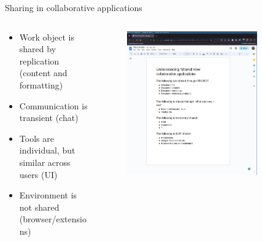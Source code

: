 \documentclass[aspectratio=169]{beamer}
\begin{document}
\begin{frame}{Sharing in collaborative applications}
    \begin{columns}
        \begin{column}{0.6\textwidth}
            \begin{itemize}
                \small
                \item Work object is shared by replication (content and formatting)
                \item Communication is transient (chat)
                \item Tools are individual, but similar across users (UI)
                \item Environment is not shared (browser/extensions)
            \end{itemize}
        \end{column}
        \begin{column}{0.4\textwidth}
            \begin{figure}[h]
                \centering
                \includegraphics[width=0.8\textwidth]{images/gdocs.png}
            \end{figure}
        \end{column}
    \end{columns}
\end{frame}
\end{document}

